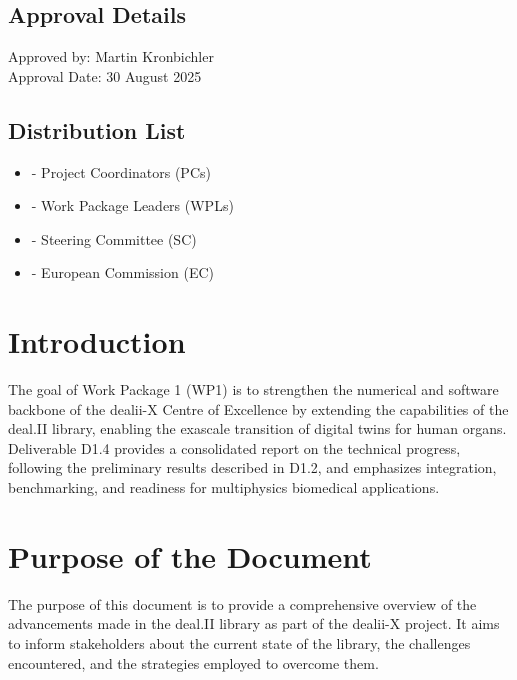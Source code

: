 \documentclass[a4paper,12pt]{article}
\begin{document}
\subsection*{{Approval Details}}
Approved by: Martin Kronbichler \\
Approval Date: 30 August 2025

\subsection*{{Distribution List}}
\begin{itemize}
    \item [] - Project Coordinators (PCs)
    \item [] - Work Package Leaders (WPLs)
    \item [] - Steering Committee (SC)
    \item [] - European Commission (EC)
\end{itemize}

\vspace*{2cm}

\disclaimer

\newpage

\tableofcontents %

\newpage

\section{{Introduction}}

The goal of Work Package 1 (WP1) is to strengthen the numerical and software backbone of the dealii-X Centre of Excellence by extending the capabilities of the deal.II library, enabling the exascale transition of digital twins for human organs. Deliverable D1.4 provides a consolidated report on the technical progress, following the preliminary results described in D1.2, and emphasizes integration, benchmarking, and readiness for multiphysics biomedical applications.

\section{{Purpose of the Document}}

The purpose of this document is to provide a comprehensive overview of the advancements made in the deal.II library as part of the dealii-X project. It aims to inform stakeholders about the current state of the library, the challenges encountered, and the strategies employed to overcome them.
\end{document}
